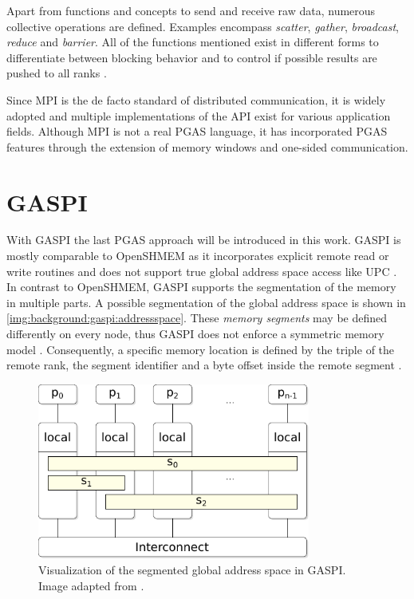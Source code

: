 Apart from functions and concepts to send and receive raw data, numerous collective operations are defined. Examples encompass \emph{scatter}, \emph{gather}, \emph{broadcast}, \emph{reduce} and \emph{barrier}. All of the functions mentioned exist in different forms to differentiate between blocking behavior and to control if possible results are pushed to all ranks \cite[ch.~5]{mpi3-std}.

Since \ac{MPI} is the de facto standard of distributed communication, it is widely adopted and multiple implementations of the \ac{API} exist for various application fields. Although \ac{MPI} is not a real \ac{PGAS} language, it has incorporated \ac{PGAS} features through the extension of memory windows and one-sided communication.

\section{\acs{GASPI}}

With \ac{GASPI} the last \ac{PGAS} approach will be introduced in this work. \Ac{GASPI} is mostly comparable to \ac{OpenSHMEM} as it incorporates explicit remote read or write routines and does not support true global address space access like \ac{UPC} \cite[p.~31\,f.]{gaspi-sum}. In contrast to \ac{OpenSHMEM}, \ac{GASPI} supports the segmentation of the memory in multiple parts. A possible segmentation of the global address space is shown in \autoref{img:background:gaspi:addressspace}. These \emph{memory segments} may be defined differently on every node, thus \ac{GASPI} does not enforce a symmetric memory model \cite[p.~19]{gaspi-sum}. Consequently, a specific memory location is defined by the triple of the remote rank, the segment identifier and a byte offset inside the remote segment \cite[p.~23]{gaspi-sum}.

\begin{figure}[htb]
\centering
\includegraphics[width=0.8\textwidth]{img/pgas-gaspi-addressspace}
\caption{Visualization of the segmented global address space in \acs{GASPI}. Image adapted from \cite[ch.~3.5.1]{diss-end}.}
\label{img:background:gaspi:addressspace}
\end{figure}


